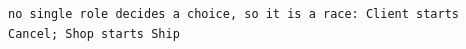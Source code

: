 \begin{lstlisting}[language={},basicstyle=\ttfamily\footnotesize,breaklines=true]
no single role decides a choice, so it is a race: Client starts Cancel; Shop starts Ship
\end{lstlisting}
